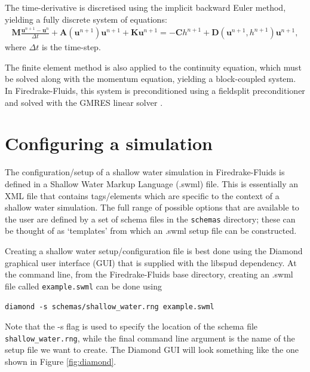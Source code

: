 \documentclass[a4paper,11pt]{report}
\begin{document}
The time-derivative is discretised using the implicit backward Euler method, yielding a fully discrete system of equations:
\begin{eqnarray}
   \mathbf{M}\frac{\mathbf{u}^{n+1} - \mathbf{u}^{n}}{\Delta t} + \mathbf{A}(\mathbf{u}^{n+1})\mathbf{u}^{n+1} + \mathbf{K}\mathbf{u}^{n+1} = -\mathbf{C}h^{n+1} + \mathbf{D}(\mathbf{u}^{n+1}, h^{n+1})\mathbf{u}^{n+1},
\end{eqnarray}
where $\Delta t$ is the time-step.

The finite element method is also applied to the continuity equation, which must be solved along with the momentum equation, yielding a block-coupled system. In Firedrake-Fluids, this system is preconditioned using a fieldsplit preconditioner \citep{Brown_etal_2012} and solved with the GMRES linear solver \citep{SaadSchultz_1986}.

\section{Configuring a simulation}
The configuration/setup of a shallow water simulation in Firedrake-Fluids is defined in a Shallow Water Markup Language (.swml) file. This is essentially an XML file that contains tags/elements which are specific to the context of a shallow water simulation. The full range of possible options that are available to the user are defined by a set of schema files in the \texttt{schemas} directory; these can be thought of as `templates' from which an .swml setup file can be constructed.

Creating a shallow water setup/configuration file is best done using the Diamond graphical user interface (GUI) \citep{Ham_etal_2009} that is supplied with the libspud dependency. At the command line, from the Firedrake-Fluids base directory, creating an .swml file called \texttt{example.swml} can be done using

\texttt{diamond -s schemas/shallow\_water.rng example.swml}

Note that the -s flag is used to specify the location of the schema file \texttt{shallow\_water.rng}, while the final command line argument is the name of the setup file we want to create. The Diamond GUI will look something like the one shown in Figure \ref{fig:diamond}.
\end{document}
